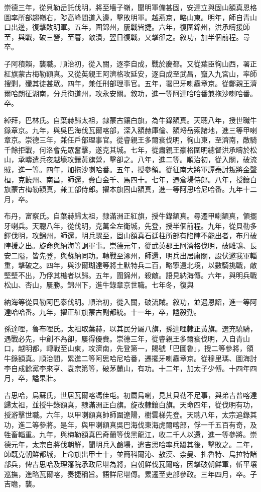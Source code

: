 \begin{pinyinscope}
崇德三年，從貝勒岳託伐明，將至墻子嶺，聞明軍備甚固，安達立與固山額真恩格圖率所部趨嶺右，陟高峰間道入邊，擊敗明軍。越燕京，略山東。明年，師自青山口出邊，復擊敗明軍。五年，圍錦州，屢戰皆捷。六年，復圍錦州，洪承疇援師至，與戰，破三營，至暮，敵潰，翌日復戰，又擊卻之。敘功，加半個前程。尋卒。

子阿積賴，襲職。順治初，從入關，逐李自成，戰於慶都。又從葉臣徇山西，署正紅旗蒙古梅勒額真。又從英親王阿濟格攻延安，逐自成至武昌，竄入九宮山，率師搜剿，殲其徒甚眾。四年，兼任刑部理事官。五年，署巴牙喇纛章京。從鄭親王濟爾哈朗征湖南，分兵徇道州，攻永安關。敘功，進一等阿達哈哈番兼拖沙喇哈番。卒。

綽拜，巴林氏。自葉赫歸太祖，隸蒙古鑲白旗，為牛錄額真。天聰八年，授世職牛錄章京。九年，與吳巴海伐瓦爾喀部，深入額赫庫倫、額埒岳索諸地，進三等甲喇章京。崇德三年，兼任戶部理事官。從睿親王多爾袞伐明，徇山東，至濟南，敵騎千餘拒戰，何洛會先眾奮擊，遂克其城。七年，從肅親王豪格圍明總督洪承疇於松山，承疇遣兵夜越壕攻鑲黃旗營，擊卻之。八年，進二等。順治初，從入關，破流賊，進一等。四年，加拖沙喇哈番。五年，授參領。從征南大將軍譚泰討叛將金聲桓，克饒州、南昌，師還，賚白金千、馬四十。七年，遷倉場侍郎。八年，授鑲白旗蒙古梅勒額真，兼工部侍郎。擢本旗固山額真，進一等阿思哈尼哈番。九年十二月，卒。

布丹，富察氏。自葉赫歸太祖，隸滿洲正紅旗，授牛錄額真。尋遷甲喇額真，領擺牙喇兵。天聰八年，從伐明，克萬全左衛城，先登，授半個前程。九年，從貝勒多鐸伐明，攻錦州，師還，明兵驟至，固山額真石廷柱所部有陷陣不能出者，布丹破陣援之出。旋命與納海等詗軍事。崇德元年，從武英郡王阿濟格伐明，破雕鶚、長安二隘，皆先登，與蘇納同功。轉戰至涿州，師還，明兵出居庸關，設伏邀我軍輜重，擊破之。四年，與沙爾瑚達等將土默特兵二百，略寧遠北境，以數騎挑戰，敵堅壁不出，乃俘其樵者以歸。五年，圍錦州，殺敵。語見納海傳。六年，與明兵戰松山、杏山，屢勝。錦州下，進牛錄章京世職。七年冬，復與

納海等從貝勒阿巴泰伐明。順治初，從入關，破流賊。敘功，並遇恩詔，進一等阿達哈哈番。九年，擢正紅旗蒙古副都統。十一年，卒，謚毅勤。

孫達哩，魯布哩氏。太祖取葉赫，以其民分屬八旗，孫達哩隸正黃旗。選充驍騎，遇戰必先，中創不為卻，屢得優賚。崇德三年，從睿親王多爾袞伐明，入自青山口，越明都，轉戰至山東，攻濟南，先登第一，賜號「巴圖魯」，授二等參將，領牛錄額真。順治間，累進二等阿思哈尼哈番，遷擺牙喇纛章京。從穆里瑪、圖海討李自成餘黨李來亨、袁宗第等，破茅麓山，有功。十二年，加太子少傅。十四年四月，卒，謚果壯。

吉思哈，烏蘇氏，世居瓦爾喀馮佳屯。初屬烏喇，見其貝勒不足事，與弟吉普喀達歸太祖，並授牛錄額真，隸滿洲正白旗。旋改隸鑲白旗。天命四年，從伐明有功，授游擊世職。六年，以甲喇額真帥師圍遼陽，樹雲梯先登。天聰八年，太宗追錄其功，進二等參將。是年，與甲喇額真吳巴海伐東海虎爾喀部，俘一千五百有奇，及牲畜輜重。九年，與梅勒額真巴奇蘭等伐黑龍江，收二千人以還，進一等參將。崇德元年，太宗自將伐朝鮮，聞明兵入鹼場，遣吉思哈率兵躡其後，擊敗之。二年，師既克朝鮮都城，上命旗出甲士十，並簡科爾沁、敖漢、柰曼、扎魯特、烏拉特諸部兵，俾吉思哈及理籓院承政尼堪為將，自朝鮮伐瓦爾喀，因擊破朝鮮軍，斬平壤巡撫，進略瓦爾喀，奏捷稱旨。語詳尼堪傳。累遷至吏部參政。三年四月，卒。子吉瞻，襲。


\end{pinyinscope}
